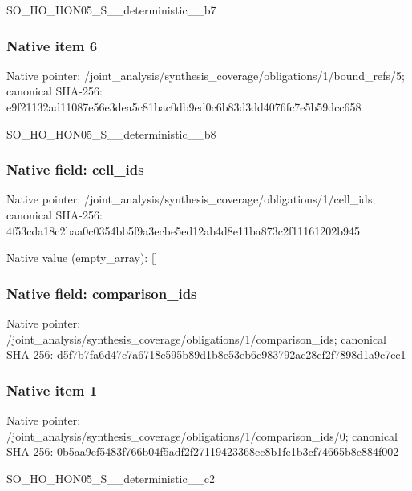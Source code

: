 \documentclass[10pt,a4paper]{article}
\begin{document}
\begingroup\raggedright\sloppy SO\_\allowbreak{}HO\_\allowbreak{}HON05\_\allowbreak{}S\_\allowbreak{}\_\allowbreak{}deterministic\_\allowbreak{}\_\allowbreak{}b7\par\endgroup

\subsubsection{Native item 6}
Native pointer: /joint\_\allowbreak{}analysis/synthesis\_\allowbreak{}coverage/obligations/1/bound\_\allowbreak{}refs/5; canonical SHA-256: e9f21132ad11087e56e3dea5c81bac0db9ed0c6b83d3dd4076fc7e5b59dcc658

\begingroup\raggedright\sloppy SO\_\allowbreak{}HO\_\allowbreak{}HON05\_\allowbreak{}S\_\allowbreak{}\_\allowbreak{}deterministic\_\allowbreak{}\_\allowbreak{}b8\par\endgroup

\subsubsection{Native field: cell\_\allowbreak{}ids}
Native pointer: /joint\_\allowbreak{}analysis/synthesis\_\allowbreak{}coverage/obligations/1/cell\_\allowbreak{}ids; canonical SHA-256: 4f53cda18c2baa0c0354bb5f9a3ecbe5ed12ab4d8e11ba873c2f11161202b945

Native value (empty\_\allowbreak{}array): []

\subsubsection{Native field: comparison\_\allowbreak{}ids}
Native pointer: /joint\_\allowbreak{}analysis/synthesis\_\allowbreak{}coverage/obligations/1/comparison\_\allowbreak{}ids; canonical SHA-256: d5f7b7fa6d47c7a6718c595b89d1b8e53eb6c983792ac28cf2f7898d1a9c7ec1

\subsubsection{Native item 1}
Native pointer: /joint\_\allowbreak{}analysis/synthesis\_\allowbreak{}coverage/obligations/1/comparison\_\allowbreak{}ids/0; canonical SHA-256: 0b5aa9ef5483f766b04f5adf2f27119423368cc8b1fe1b3cf74665b8c884f002

\begingroup\raggedright\sloppy SO\_\allowbreak{}HO\_\allowbreak{}HON05\_\allowbreak{}S\_\allowbreak{}\_\allowbreak{}deterministic\_\allowbreak{}\_\allowbreak{}c2\par\endgroup
\end{document}
